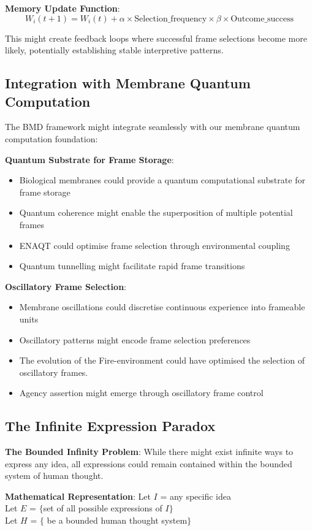 \documentclass[12pt]{article}
\begin{document}
\textbf{Memory Update Function}:
$$W_i(t+1) = W_i(t) + \alpha \times \text{Selection\_frequency} \times \beta \times \text{Outcome\_success}$$

This might create feedback loops where successful frame selections become more likely, potentially establishing stable interpretive patterns.

\subsection{Integration with Membrane Quantum Computation}

The BMD framework might integrate seamlessly with our membrane quantum computation foundation:

\textbf{Quantum Substrate for Frame Storage}:
\begin{itemize}
\item Biological membranes could provide a quantum computational substrate for frame storage
\item Quantum coherence might enable the superposition of multiple potential frames
\item ENAQT could optimise frame selection through environmental coupling
\item Quantum tunnelling might facilitate rapid frame transitions
\end{itemize}

\textbf{Oscillatory Frame Selection}:
\begin{itemize}
\item Membrane oscillations could discretise continuous experience into frameable units
\item Oscillatory patterns might encode frame selection preferences
\item The evolution of the Fire-environment could have optimised the selection of oscillatory frames.
\item Agency assertion might emerge through oscillatory frame control
\end{itemize}

\subsection{The Infinite Expression Paradox}

\textbf{The Bounded Infinity Problem}: While there might exist infinite ways to express any idea, all expressions could remain contained within the bounded system of human thought.

\textbf{Mathematical Representation}:
Let $I$ = any specific idea \\
Let $E$ = $\{$set of all possible expressions of $I\}$ \\
Let $H$ = $\{$ be a bounded human thought system$\}$
\end{document}
